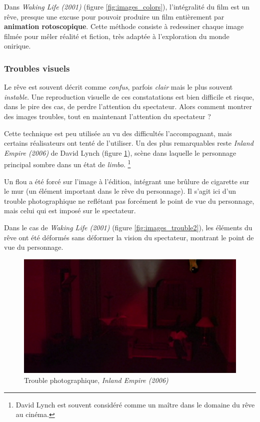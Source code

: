 \documentclass[../main.tex]{subfile}
\begin{document}
Dans \textit{Waking Life (2001)} (figure \ref{fig:images_colors}), l'intégralité
du film est un rêve, presque une excuse pour pouvoir produire un film
entièrement par \textbf{animation rotoscopique}. Cette méthode consiste à
redessiner chaque image filmée pour mêler réalité et fiction, très adaptée à
l'exploration du monde onirique.

\subsubsection{Troubles visuels}

Le rêve est souvent décrit comme \emph{confus}, parfois \emph{clair} mais le
plus souvent \emph{instable}. Une reproduction visuelle de ces constatations
est bien difficile et risque, dans le pire des cas, de perdre l'attention du
spectateur. Alors comment montrer des images troubles, tout en maintenant
l'attention du spectateur ?

Cette technique est peu utilisée au vu des difficultés l'accompagnant, mais
certains réalisateurs ont tenté de l'utiliser. Un des plus remarquables reste
\textit{Inland Empire (2006)} de David Lynch (figure \ref{fig:images_trouble}),
scène dans laquelle le personnage principal sombre dans un état de
\emph{limbo}. \footnote{David Lynch est souvent considéré comme un maître dans
le domaine du rêve au cinéma.}

Un flou a été forcé sur l'image à l'édition, intégrant une brûlure de cigarette
sur le mur (un élément important dans le rêve du personnage). Il s'agit ici d'un
trouble photographique ne reflétant pas forcément le point de vue du personnage,
mais celui qui est imposé sur le spectateur.

Dans le cas de \textit{Waking Life (2001)} (figure \ref{fig:images_trouble2}),
les éléments du rêve ont été déformés sans déformer la vision du spectateur,
montrant le point de vue du personnage.

\begin{figure}
    \centering
    \includegraphics[width=\linewidth]{images/trouble}
    \caption{Trouble photographique, \emph{Inland Empire (2006)}}
    \label{fig:images_trouble}
\end{figure}
\end{document}
